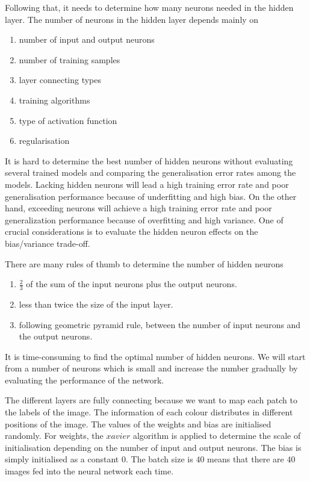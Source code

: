 Following that, it needs to determine how many neurons needed in the hidden layer. The number of neurons in the hidden layer depends mainly on
\begin{enumerate}
  \item number of input and output neurons
  \item number of training samples
  \item layer connecting types
  \item training algorithms
  \item type of activation function
  \item regularisation
\end{enumerate}
It is hard to determine the best number of hidden neurons without evaluating several trained models and comparing the generalisation error rates among the models. Lacking hidden neurons will lead a high training error rate and poor generalisation performance because of underfitting and high bias. On the other hand, exceeding neurons will achieve a high training error rate and poor generalization performance because of overfitting and high variance. One of crucial considerations is to evaluate the hidden neuron effects on the bias/variance trade-off.

There are many rules of thumb to determine the number of hidden neurons \citep{heaton2008introduction}
\begin{enumerate}
  \item $\frac{2}{3}$ of the sum of the input neurons plus the output neurons.
  \item less than twice the size of the input layer.
  \item following geometric pyramid rule, between the number of input neurons and the output neurons.
\end{enumerate}
It is time-consuming to find the optimal number of hidden neurons. We will start from a number of neurons which is small and increase the number gradually by evaluating the performance of the network.

The different layers are fully connecting because we want to map each patch to the labels of the image. The information of each colour distributes in different positions of the image. The values of the weights and bias are initialised randomly. For weights, the $xavier$ algorithm is applied to determine the scale of initialisation depending on the number of input and output neurons. The bias is simply initialised as a constant $0$. The batch size is $40$ means that there are $40$ images fed into the neural network each time.

